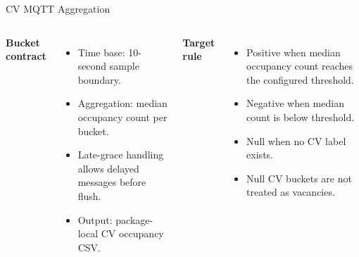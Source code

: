 \documentclass[aspectratio=169]{beamer}
\begin{document}
\begin{frame}[shrink=4]{CV MQTT Aggregation}
\begin{columns}[T,onlytextwidth]
\textbf{Bucket contract}
\begin{itemize}
  \item Time base: 10-second sample boundary.
  \item Aggregation: median occupancy count per bucket.
  \item Late-grace handling allows delayed messages before flush.
  \item Output: package-local CV occupancy CSV.
\end{itemize}

\textbf{Target rule}
\begin{itemize}
  \item Positive when median occupancy count reaches the configured threshold.
  \item Negative when median count is below threshold.
  \item Null when no CV label exists.
  \item Null CV buckets are not treated as vacancies.
\end{itemize}
\end{columns}
\tightsep
\begin{center}
\hspace{0.35em}
\hspace{0.35em}
\par\vspace{0.25em}

\end{center}
\end{frame}
\end{document}
